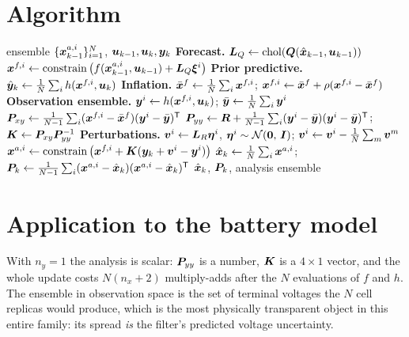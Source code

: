 \section{Algorithm}
\begin{algorithm}[H]
\caption{EnKF (stochastic, perturbed observations) --- one sampling period}
\begin{algorithmic}[1]
\Require ensemble $\{\bm{x}^{a,i}_{k-1}\}_{i=1}^N$, $\bm{u}_{k-1},\bm{u}_k,\bm{y}_k$
\State \textbf{Forecast.} $\bm{L}_Q \gets \operatorname{chol}(\bm{Q}(\hat{\bm{x}}_{k-1},\bm{u}_{k-1}))$
 \State $\bm{x}^{f,i} \gets \operatorname{constrain}\big(f(\bm{x}^{a,i}_{k-1},\bm{u}_{k-1}) + \bm{L}_Q\bm\xi^i\big)$ \EndFor
\State \textbf{Prior predictive.} $\hat{\bm{y}}_k \gets \frac1N\sum_i h(\bm{x}^{f,i},\bm{u}_k)$
\State \textbf{Inflation.} $\bar{\bm{x}}^f \gets \frac1N\sum_i \bm{x}^{f,i}$; \; $\bm{x}^{f,i}\gets \bar{\bm{x}}^f + \rho(\bm{x}^{f,i}-\bar{\bm{x}}^f)$
\State \textbf{Observation ensemble.} $\bm{y}^i \gets h(\bm{x}^{f,i},\bm{u}_k)$; \; $\bar{\bm{y}}\gets\frac1N\sum_i\bm{y}^i$
\State $\bm{P}_{xy} \gets \frac{1}{N-1}\sum_i (\bm{x}^{f,i}-\bar{\bm{x}}^f)(\bm{y}^i-\bar{\bm{y}})^{\mathsf{T}}$
\State $\bm{P}_{yy} \gets \bm{R} + \frac{1}{N-1}\sum_i (\bm{y}^i-\bar{\bm{y}})(\bm{y}^i-\bar{\bm{y}})^{\mathsf{T}}$; \quad $\bm{K} \gets \bm{P}_{xy}\bm{P}_{yy}^{-1}$
\State \textbf{Perturbations.} $\bm{v}^i \gets \bm{L}_R\bm\eta^i$, $\bm\eta^i\sim\mathcal{N}\!\left(\bm 0,\,\bm{I}\right)$; \; $\bm{v}^i \gets \bm{v}^i - \frac1N\sum_m \bm{v}^m$
 \State $\bm{x}^{a,i} \gets \operatorname{constrain}\big(\bm{x}^{f,i} + \bm{K}(\bm{y}_k + \bm{v}^i - \bm{y}^i)\big)$ \EndFor
\State $\hat{\bm{x}}_k \gets \frac1N\sum_i \bm{x}^{a,i}$; \quad $\bm{P}_k \gets \frac{1}{N-1}\sum_i (\bm{x}^{a,i}-\hat{\bm{x}}_k)(\bm{x}^{a,i}-\hat{\bm{x}}_k)^{\mathsf{T}}$
\Ensure $\hat{\bm{x}}_k$, $\bm{P}_k$, analysis ensemble
\end{algorithmic}
\end{algorithm}

\section{Application to the battery model}
\label{sec:enkf-battery}
With $n_y = 1$ the analysis is scalar: $\bm{P}_{yy}$ is a number, $\bm{K}$ is a $4\times1$ vector, and the
whole update costs $N(n_x + 2)$ multiply-adds after the $N$ evaluations of $f$ and $h$.  The
ensemble in observation space is the set of terminal voltages the $N$ cell replicas would produce,
which is the most physically transparent object in this entire family: its spread \emph{is} the
filter's predicted voltage uncertainty.

